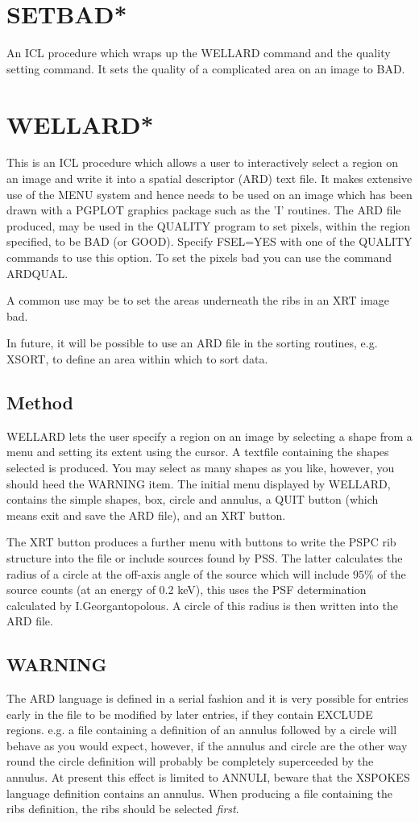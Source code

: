 \documentclass{book}
\renewcommand{\_}{{\tt\char'137}}     %
\begin{document}
\section{SETBAD*}
An ICL procedure which wraps up the WELLARD command and the quality
setting command. It sets the quality of a complicated area on an image
to BAD.

\section{WELLARD*}
This is an ICL procedure which allows a user to interactively select a
region on an image and write it into a spatial descriptor (ARD) text file.
It makes extensive use of the MENU system and hence needs to be used
on an image which has been drawn with a PGPLOT graphics package such
as the 'I' routines. The ARD file produced, may be used in the QUALITY
program to set pixels, within the region specified, to be BAD (or GOOD).
Specify FSEL=YES with one of the QUALITY commands to use this option.
To set the pixels bad you can use the command ARDQUAL.

A common use may be to set the areas underneath the ribs in an XRT image
bad.

In future, it will be possible to use an ARD file in the sorting routines,
e.g. XSORT, to define an area within which to sort data.
\subsection{Method}
WELLARD lets the user specify a region on an image by selecting a shape
from a menu and setting its extent using the cursor. A textfile
containing the shapes selected is produced. You may select as many shapes
as you like, however, you should heed the WARNING item.
The initial menu displayed by WELLARD, contains the simple shapes, box, circle
and annulus, a QUIT button (which means exit and save the ARD file),
and an XRT button.

The XRT button produces a further menu with buttons
to write the PSPC rib structure into the file or include sources
found by PSS. The latter calculates the radius of a circle at the
off-axis angle of the source which will include 95\% of the source
counts (at an energy of 0.2 keV), this uses the PSF determination
calculated by I.Georgantopolous. A circle of this radius is then written
into the ARD file.

\subsection{WARNING}
The ARD language is defined in a serial fashion and it is very possible
for entries early in the file to be modified by later entries, if they
contain EXCLUDE regions. e.g. a file containing a definition of an
annulus followed by a circle will behave as you would expect, however, if the
annulus and circle are the other way round the circle definition will
probably be completely superceeded by the annulus. At present this
effect is limited to ANNULI, beware that the XSPOKES language definition
contains an annulus. When producing a file containing the ribs definition,
the ribs should be selected {\em first}.
\end{document}
